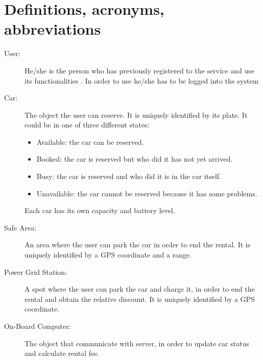\section{Definitions, acronyms, abbreviations}
\begin{description}
	\item [User:] He/she is the person who has previously registered to the service and use its functionalities . In order to use he/she has to be logged into the system
	\item [Car:] The object the user can reserve. It is uniquely identified by its plate. It could be in one of three different states:
	\begin{itemize}
		\item Available: the car can be reserved.
		\item Booked: the car is reserved but who did it has not yet arrived.
		\item Busy: the car is reserved and who did it is in the car itself.
		\item Unavailable: the car cannot be reserved because it has some problems.
	\end{itemize}
	Each car has its own capacity and battery level.
	\item [Safe Area:] An area where the user can park the car in order to end the rental. It is uniquely identified by a GPS coordinate and a range.
	\item [Power Grid Station:] A spot where the user can park the car and charge it, in order to end the rental and obtain the relative discount. It is uniquely identified by a GPS coordinate.
	\item [On-Board Computer:] The object that communicate with server, in order to update car status and calculate rental fee.
	
\end{description}
